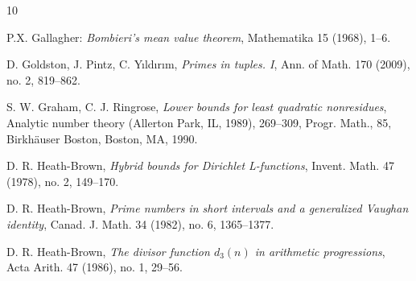 \documentclass[12pt,a4paper,reqno]{amsart}
\numberwithin{equation}{section}
\theoremstyle{plain}
\theoremstyle{definition}
\begin{document}
\begin{thebibliography}{10}


 P.X. Gallagher: \textit{Bombieri's mean value
    theorem}, Mathematika 15 (1968), 1--6.

 D. Goldston, J. Pintz, C. Y{\i}ld{\i}r{\i}m,
  \emph{Primes in tuples. I}, Ann. of Math. 170 (2009), no. 2,
  819--862.


 

  S. W. Graham, C. J. Ringrose, \emph{Lower bounds for
     least quadratic nonresidues}, Analytic number theory (Allerton
   Park, IL, 1989), 269--309, Progr. Math., 85, Birkh\"auser Boston,
   Boston, MA, 1990.




  D. R. Heath-Brown, \emph{Hybrid bounds for
     Dirichlet L-functions}, Invent. Math. 47 (1978), no. 2, 149--170.

  D. R. Heath-Brown, \emph{Prime numbers in short
     intervals and a generalized Vaughan identity}, Canad. J. Math. 34
   (1982), no. 6, 1365--1377.

  D. R. Heath-Brown, \emph{The divisor function
     $d_3(n)$ in arithmetic progressions}, Acta Arith. 47 (1986),
   no. 1, 29--56.
	

\end{thebibliography}
\end{document}
